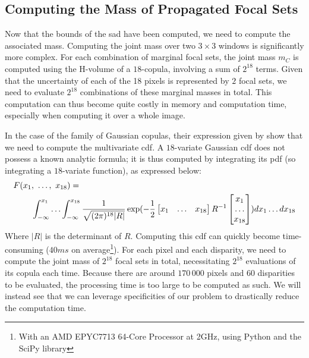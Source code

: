 \subsection{Computing the Mass of Propagated Focal Sets}\label{sec:propagated_masses}
Now that the bounds of the \acrshort{sad} have been computed, we need to compute the associated mass. Computing the joint mass over two $3 \times 3$ windows is significantly more complex. For each combination of marginal focal sets, the joint mass $m_C$ is computed using the H-volume of a $18$-copula, involving a sum of $2^{18}$ terms. Given that the uncertainty of each of the 18 pixels is represented by $2$ focal sets, we need to evaluate $2^{18}$ combinations of these marginal masses in total. This computation can thus become quite costly in memory and computation time, especially when computing it over a whole image.

In the case of the family of Gaussian copulas, their expression given by  show that we need to compute the multivariate \acrshort{cdf}. A $18$-variate Gaussian \acrshort{cdf} does not possess a known analytic formula; it is thus computed by integrating its \acrfull{pdf} (so integrating a $18$-variate function), as expressed below:
\begin{align}\label{eq:gaussian_cdf}
    F(x_1 &, ~\ldots, ~ x_{18}) =\nonumber\\ &\int_{-\infty}^{x_1}\ldots\int_{-\infty}^{x_{18}}\frac{1}{\sqrt{(2\pi)^{18}|R|}}\exp(-\frac{1}{2}\begin{bmatrix}x_1 & \ldots & x_{18}\end{bmatrix}R^{-1}\begin{bmatrix}x_1 \\ \ldots \\ x_{18}\end{bmatrix})dx_1\ldots dx_{18}
\end{align}
Where $|R|$ is the determinant of $R$. Computing this \acrshort{cdf} can quickly become time-consuming ($40ms$ on average\footnote{With an AMD EPYC7713  64-Core Processor at 2GHz, using Python and the SciPy library}). For each pixel and each disparity, we need to compute the joint mass of $2^{18}$ focal sets in total, necessitating $2^{18}$ evaluations of its copula each time. Because there are around $170\,000$ pixels and $60$ disparities to be evaluated, the processing time is too large to be computed as such. We will instead see that we can leverage specificities of our problem to drastically reduce the computation time.
 
